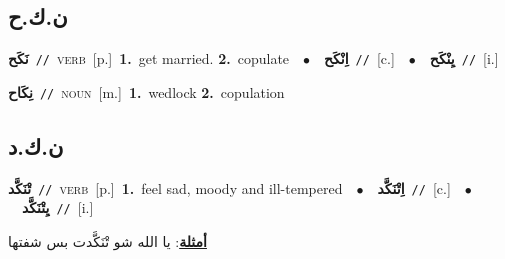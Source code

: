 \documentclass[10pt,a4paper,twoside]{article} %
\begin{document}
\begin{multicols}{2}
\vspace{-3mm}
\subsection*{\color{blue}\foreignlanguage{arabic}{ن.ك.ح}\color{blue}{}} 

{\setlength\topsep{0pt}\textbf{\foreignlanguage{arabic}{نَكَح}}\ {\color{gray}\texttt{//}\color{black}}\ \textsc{verb}\ [p.]\ \textbf{1.}~get married.  \textbf{2.}~copulate\ \ $\bullet$\ \ \setlength\topsep{0pt}\textbf{\foreignlanguage{arabic}{اِنْكَح}}\ {\color{gray}\texttt{//}\color{black}}\ [c.]\ \ $\bullet$\ \ \setlength\topsep{0pt}\textbf{\foreignlanguage{arabic}{يِنْكَح}}\ {\color{gray}\texttt{//}\color{black}}\ [i.]\ } \vspace{2mm}

{\setlength\topsep{0pt}\textbf{\foreignlanguage{arabic}{نِكَاح}}\ {\color{gray}\texttt{//}\color{black}}\ \textsc{noun}\ [m.]\ \textbf{1.}~wedlock  \textbf{2.}~copulation\ } \vspace{2mm}

\vspace{-3mm}
\subsection*{\color{blue}\foreignlanguage{arabic}{ن.ك.د}\color{blue}{}} 

{\setlength\topsep{0pt}\textbf{\foreignlanguage{arabic}{تْنَكَّد}}\ {\color{gray}\texttt{//}\color{black}}\ \textsc{verb}\ [p.]\ \textbf{1.}~feel sad, moody and ill-tempered\ \ $\bullet$\ \ \setlength\topsep{0pt}\textbf{\foreignlanguage{arabic}{اِتْنَكَّد}}\ {\color{gray}\texttt{//}\color{black}}\ [c.]\ \ $\bullet$\ \ \setlength\topsep{0pt}\textbf{\foreignlanguage{arabic}{يِتْنَكَّد}}\ {\color{gray}\texttt{//}\color{black}}\ [i.]\  \begin{flushright}\color{gray}\foreignlanguage{arabic}{\textbf{\underline{\foreignlanguage{arabic}{أمثلة}}}: يا الله شو تْنَكَّدت بس شفتها}\end{flushright}\color{black}} \vspace{2mm}


\end{multicols}
\end{document}
